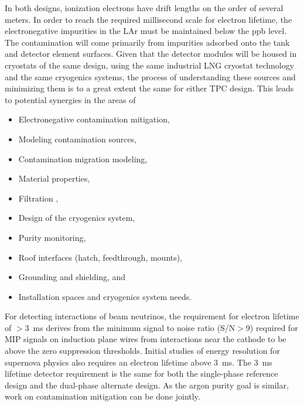 In both designs, ionization electrons have drift lengths on the order
of several meters. In order to reach the required millisecond scale for
electron lifetime, the electronegative impurities in the LAr must be
maintained below the ppb level. The contamination will
come primarily from impurities adsorbed onto the tank and detector element surfaces.
Given that the detector modules will be housed in cryostats of the same design,
using the same industrial LNG cryostat technology and the same cryogenics systems,
the process of understanding these sources and minimizing them
is to a great extent the same for either TPC design. This leads to potential synergies in the areas of
\begin{itemize}
\item Electronegative contamination mitigation, 
\item Modeling contamination sources,
\item Contamination migration modeling,
\item Material properties,
\item Filtration	,
\item Design of the cryogenics system,
\item Purity monitoring,	
\item Roof interfaces (hatch, feedthrough, mounts),
\item Grounding and shielding, and
\item Installation spaces and cryogenics system needs.	
\end{itemize}



For detecting interactions of beam neutrinos, the requirement for
electron lifetime of $>$3~ms derives from the minimum signal to noise
ratio (S/N$>$9) required for MIP signals on induction plane wires from
interactions near the cathode to be above the zero suppression
thresholds.  Initial studies of energy resolution for supernova physics
also requires an electron lifetime above 3~ms.  The 3~ms lifetime
detector requirement is the same for both the single-phase reference
design and the dual-phase alternate design.  As the argon purity goal
is similar, work on contamination mitigation can be done jointly.

